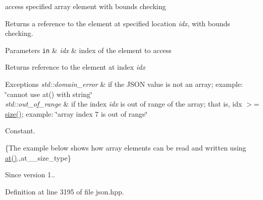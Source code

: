 access specified array element with bounds checking 

Returns a reference to the element at specified location {\itshape idx}, with bounds checking.


\begin{DoxyParams}[1]{Parameters}
\mbox{\tt in}  & {\em idx} & index of the element to access\\
\hline
\end{DoxyParams}
\begin{DoxyReturn}{Returns}
reference to the element at index {\itshape idx} 
\end{DoxyReturn}

\begin{DoxyExceptions}{Exceptions}
{\em std\+::domain\+\_\+error} & if the J\+S\+O\+N value is not an array; example\+: {\ttfamily \char`\"{}cannot use at() with string\char`\"{}} \\
\hline
{\em std\+::out\+\_\+of\+\_\+range} & if the index {\itshape idx} is out of range of the array; that is, {\ttfamily idx $>$= \hyperlink{classnlohmann_1_1basic__json_a01833b332b68d9af1f7cd7a816c39e49}{size()}}; example\+: {\ttfamily \char`\"{}array index 7 is out of range\char`\"{}}\\
\hline
\end{DoxyExceptions}
Constant.

\{The example below shows how array elements can be read and written using {\ttfamily \hyperlink{classnlohmann_1_1basic__json_a214a8c22d616fd3567b88932c07436c9}{at()}}.,at\+\_\+\+\_\+size\+\_\+type\}

\begin{DoxySince}{Since}
version 1.. 
\end{DoxySince}


Definition at line 3195 of file json.\+hpp.

\hypertarget{classnlohmann_1_1basic__json_ab31368c0b67f8e4f291a45e6498018be}{}
